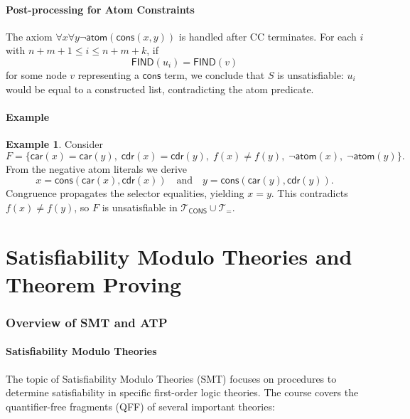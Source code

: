 \documentclass[11pt,a4paper]{article}
\theoremstyle{definition}
\newtheorem{example}{Example}[section]
\theoremstyle{plain}
\theoremstyle{remark}
\begin{document}
\subsection{Post-processing for Atom Constraints}

The axiom $\forall x \forall y \neg \textsf{atom}(\textsf{cons}(x, y))$ is handled after CC terminates. For each $i$ with $n+m+1 \leq i \leq n+m+k$, if
\[
\textsf{FIND}(u_i) = \textsf{FIND}(v)
\]
for some node $v$ representing a $\textsf{cons}$ term, we conclude that $S$ is unsatisfiable: $u_i$ would be equal to a constructed list, contradicting the atom predicate.

\subsection{Example}

\begin{example}
Consider
\[
F = \{\textsf{car}(x) = \textsf{car}(y),\; \textsf{cdr}(x) = \textsf{cdr}(y),\; f(x) \neq f(y),\; \neg \textsf{atom}(x),\; \neg \textsf{atom}(y)\}.
\]
From the negative atom literals we derive
\[
x = \textsf{cons}(\textsf{car}(x), \textsf{cdr}(x)) \quad \text{and} \quad y = \textsf{cons}(\textsf{car}(y), \textsf{cdr}(y)).
\]
Congruence propagates the selector equalities, yielding $x = y$. This contradicts $f(x) \neq f(y)$, so $F$ is unsatisfiable in $\mathcal{T}_{\textsf{CONS}} \cup \mathcal{T}_{=}$. 
\end{example}



\newpage 

\part{Satisfiability Modulo Theories and Theorem Proving}

\section{Overview of SMT and ATP}

\subsection{Satisfiability Modulo Theories}

The topic of Satisfiability Modulo Theories (SMT) focuses on procedures to determine satisfiability in specific first-order logic theories. The course covers the quantifier-free fragments (QFF) of several important theories:
\end{document}
